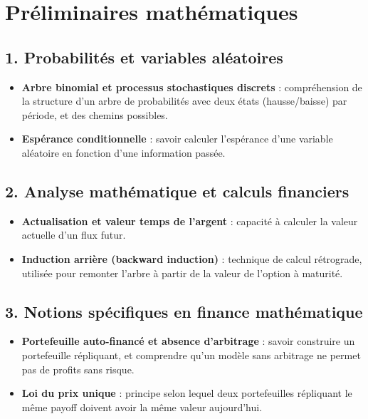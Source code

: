 \documentclass[12pt,a4paper]{article}
\begin{document}
\newpage

\appendix

\section{Préliminaires mathématiques}
\subsection*{1. Probabilités et variables aléatoires}

\begin{itemize}
    \item \textbf{Arbre binomial et processus stochastiques discrets} : compréhension de la structure d’un arbre de probabilités avec deux états (hausse/baisse) par période, et des chemins possibles.
    \item \textbf{Espérance conditionnelle} : savoir calculer l’espérance d’une variable aléatoire en fonction d’une information passée.
\end{itemize}

\subsection*{2. Analyse mathématique et calculs financiers}

\begin{itemize}
    \item \textbf{Actualisation et valeur temps de l'argent} : capacité à calculer la valeur actuelle d’un flux futur.
    \item \textbf{Induction arrière (backward induction)} : technique de calcul rétrograde, utilisée pour remonter l’arbre à partir de la valeur de l’option à maturité.
\end{itemize}

\subsection*{3. Notions spécifiques en finance mathématique}

\begin{itemize}
    \item \textbf{Portefeuille auto-financé et absence d’arbitrage} : savoir construire un portefeuille répliquant, et comprendre qu’un modèle sans arbitrage ne permet pas de profits sans risque.
    \item \textbf{Loi du prix unique} : principe selon lequel deux portefeuilles répliquant le même payoff doivent avoir la même valeur aujourd’hui.
\end{itemize}
\end{document}
